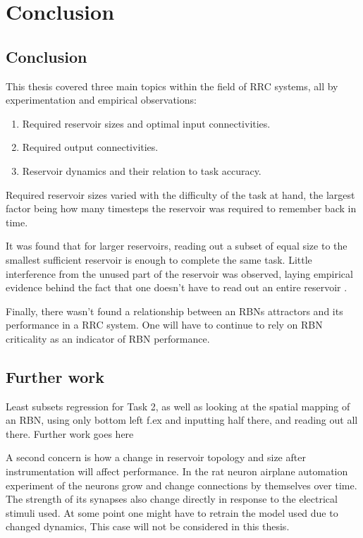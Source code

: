 \chapter{Conclusion}
\label{chapter:conclusion}

\section{Conclusion}

This thesis covered three main topics within the field of RRC systems,
all by experimentation and empirical observations:

\begin{enumerate}
    \item Required reservoir sizes and optimal input connectivities.
    \item Required output connectivities.
    \item Reservoir dynamics and their relation to task accuracy.
\end{enumerate}

Required reservoir sizes varied with the difficulty of the task at hand,
the largest factor being how many timesteps the reservoir was required to remember back in time.

It was found that for larger reservoirs, reading out a subset of equal size to the smallest sufficient reservoir is enough to complete the same task.
Little interference from the unused part of the reservoir was observed,
laying empirical evidence behind the fact that one doesn't have to read out an entire reservoir .

Finally, there wasn't found a relationship between an RBNs attractors and its performance in a RRC system.
One will have to continue to rely on RBN criticality as an indicator of RBN performance.


\section{Further work}


Least subsets regression for Task 2,
as well as looking at the spatial mapping of an RBN,
using only bottom left f.ex and inputting half there, and reading out all there.
Further work goes here 


A second concern is how a change in reservoir topology and size after instrumentation will affect performance.
In the rat neuron airplane automation experiment of \cite{demarse2005adaptive} the neurons grow and change connections by themselves over time.
The strength of its synapses also change directly in response to the electrical stimuli used.
At some point one might have to retrain the model used due to changed dynamics,
This case will not be considered in this thesis.

